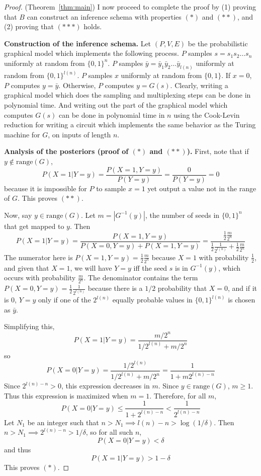 \documentclass{article}
\theoremstyle{definition}
\theoremstyle{remark}
\begin{document}
\begin{proof}{(Theorem~\ref{thm:main})}
I now proceed to complete the proof by (1) proving that $B$ can construct an inference schema with properties $(*)$ and $(**)$, and (2) proving that $(***)$ holds.

\medskip
\noindent \textbf{Construction of the inference schema.}
Let $(P, V, E)$ be the probabilistic graphical model which implements the following process.
$P$ samples $s = s_1 s_2 \dots s_n$ uniformly at random from $\{0, 1\}^n$.
$P$ samples $\bar{y} = \bar{y}_1 \bar{y}_2 \dots \bar{y}_{l(n)}$ uniformly at random from $\{0, 1\}^{l(n)}$.
$P$ samples $x$ uniformly at random from $\{0, 1\}$.
If $x = 0$, $P$ computes $y = \bar{y}$.
Otherwise, $P$ computes $y = G(s)$.
Clearly, writing a graphical model which does the sampling and multiplexing steps can be done in polynomial time.
And writing out the part of the graphical model which computes $G(s)$ can be done in polynomial time in $n$ using the Cook-Levin reduction for writing a circuit which implements the same behavior as the Turing machine for $G$, on inputs of length $n$.

\medskip
\noindent \textbf{Analysis of the posteriors (proof of $(*)$ and $(**)$).}
First, note that if $y \notin \text{range}(G)$,
$$
P(X = 1 | Y = y) = \frac{P(X = 1, Y = y)}{P(Y = y)} = \frac{0}{P(Y = y)} = 0
$$
because it is impossible for $P$ to sample $x = 1$ yet output a value not in the range of $G$.
This proves $(**)$.

Now, say $y \in \text{range}(G)$.
Let $m = |G^{-1}(y)|$, the number of seeds in $\{0, 1\}^n$ that get mapped to $y$.
Then
$$
P(X = 1 | Y = y) = \frac{P(X = 1, Y = y)}{P(X = 0, Y = y) + P(X = 1, Y = y)}
= \frac{
    \frac{1}{2} \frac{m}{2^n}
}{
    \frac{1}{2} \frac{1}{2^{l(n)}} + \frac{1}{2} \frac{m}{2^n}
}
$$
The numerator here is $P(X = 1, Y = y) = \frac{1}{2} \frac{m}{2^n}$ 
because $X = 1$ with probability $\frac{1}{2}$, and given that $X = 1$, we will have $Y = y$ iff the seed $s$ is in $G^{-1}(y)$, which occurs with probability $\frac{m}{2^n}$.
The denominator contains the term $P(X = 0, Y = y) = \frac{1}{2} \frac{1}{2^{l(n)}}$ because there is a $1/2$ probability that $X = 0$, and if it is $0$, $Y = y$ only if one of the $2^{l(n)}$ equally probable values in $\{0, 1\}^{l(n)}$ is chosen as $\bar{y}$.

Simplifying this, 
$$
P(X = 1 | Y = y) = \frac{
    m/2^n
}{
    1/2^{l(n)} + m/2^n
}
$$
so
$$
P(X = 0 | Y = y) = \frac{
    1/2^{l(n)}
}{
    1/2^{l(n)} + m/2^n
} = \frac{1}{1 + m 2^{l(n) - n}}
$$
Since $2^{l(n) - n} > 0$, this expression decreases in $m$.
Since $y \in \text{range}(G)$, $m \geq 1$.
Thus this expression is maximized when $m = 1$.
Therefore, for all $m$,
$$
P(X = 0 | Y = y) \leq \frac{1}{1 + 2^{l(n) - n}} < \frac{1}{2^{l(n) - n}}
$$
Let $N_1$ be an integer such that
$n > N_1 \implies l(n) - n > \log(1/\delta)$.
Then $n > N_1 \implies 2^{l(n) - n} > 1/\delta$,
so for all such $n$,
$$
P(X = 0 | Y = y) < \delta
$$
and thus
$$
P(X = 1 | Y = y) > 1 - \delta
$$
This proves $(*)$.


\end{proof}
\end{document}
